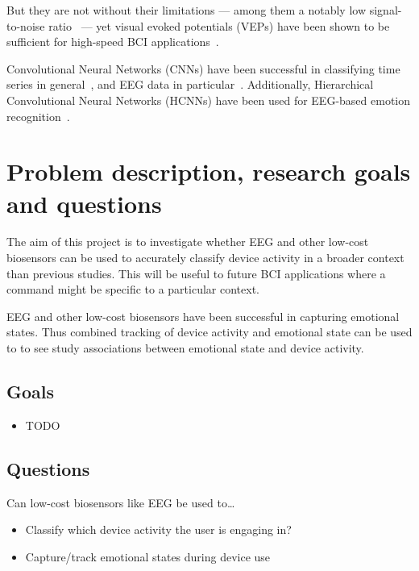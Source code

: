 \documentclass{IEEEtran}
\begin{document}
But they are not without their limitations --- among them a notably low signal-to-noise ratio~\cite{mcfarland_eeg-based_2017} --- yet visual evoked potentials (VEPs) have been shown to be sufficient for high-speed BCI applications~\cite{spuler_high-speed_2017}.


Convolutional Neural Networks (CNNs) have been successful in classifying time series in general~\cite{zhao_convolutional_2017}, and EEG data in particular~\cite{schirrmeister_deep_2017}. Additionally, Hierarchical Convolutional Neural Networks (HCNNs) have been used for EEG-based emotion recognition~\cite{li_hierarchical_2018}.


\section{Problem description, research goals and questions}

The aim of this project is to investigate whether EEG and other low-cost biosensors can be used to accurately classify device activity in a broader context than previous studies. This will be useful to future BCI applications where a command might be specific to a particular context.

EEG and other low-cost biosensors have been successful in capturing emotional states. Thus combined tracking of device activity and emotional state can be used to to see study associations between emotional state and device activity. %

\subsection{Goals}

\begin{itemize}
    \item{TODO}
\end{itemize}

\subsection{Questions}

Can low-cost biosensors like EEG be used to\ldots

\begin{itemize}
    \item Classify which device activity the user is engaging in?
    \item Capture/track emotional states during device use
\end{itemize}
\end{document}
